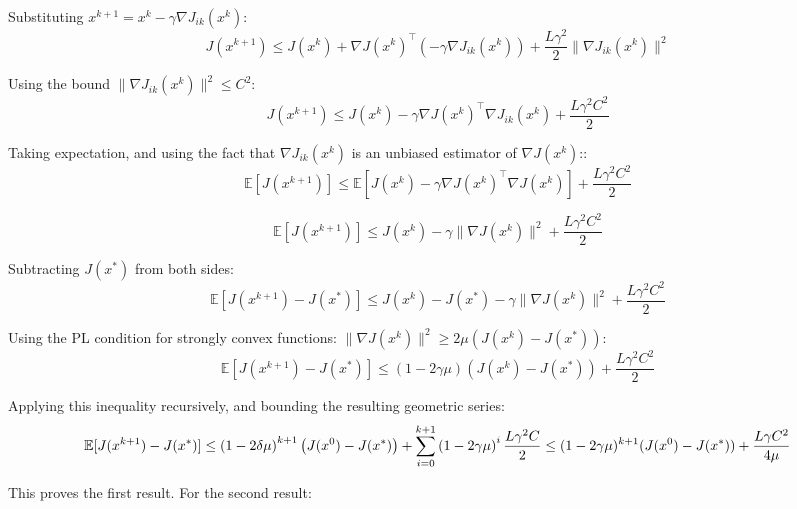   Substituting $x^{k+1} = x^k - \gamma \nabla J_{ik}(x^k)$:
    \begin{equation*}
        J(x^{k+1}) \leq J(x^k) + \nabla J(x^k)^\top(-\gamma \nabla J_{ik}(x^k)) + \frac{L\gamma^2}{2}\|\nabla J_{ik}(x^k)\|^2
    \end{equation*}

Using the bound $\|\nabla J_{ik}(x^k)\|^2 \leq C^2$:
    \begin{equation*}
        J(x^{k+1}) \leq J(x^k) - \gamma \nabla J(x^k)^\top \nabla J_{ik}(x^k) + \frac{L\gamma^2 C^2}{2}
    \end{equation*}

  Taking expectation, and using the fact that $\nabla J_{ik}(x^k)$ is an unbiased estimator of $\nabla J(x^k)$::
    \begin{equation*}
        \mathbb{E}[J(x^{k+1})] \leq \mathbb{E}[J(x^k) - \gamma \nabla J(x^k)^\top \nabla J(x^k)] + \frac{L\gamma^2 C^2}{2}
    \end{equation*}


    \begin{equation*}
        \mathbb{E}[J(x^{k+1})] \leq J(x^k) - \gamma \|\nabla J(x^k)\|^2 + \frac{L\gamma^2 C^2}{2}
    \end{equation*}

   Subtracting $J(x^*)$ from both sides:
    \begin{equation*}
        \mathbb{E}[J(x^{k+1}) - J(x^*)] \leq J(x^k) - J(x^*) - \gamma \|\nabla J(x^k)\|^2 + \frac{L\gamma^2 C^2}{2}
    \end{equation*}

   Using the PL condition for strongly convex functions: $\|\nabla J(x^k)\|^2 \geq 2\mu(J(x^k) - J(x^*))$:
    \begin{equation*}
        \mathbb{E}[J(x^{k+1}) - J(x^*)] \leq (1-2\gamma\mu)(J(x^k) - J(x^*)) + \frac{L\gamma^2 C^2}{2}
    \end{equation*}

    Applying this inequality recursively, and bounding the resulting geometric series:
    \begin{equation*}
        \mathbb{E}[J(x^{k+1}) - J(x^*)] \leq \left(1 - 2 \delta \mu\right)^{k+1} \left(J(x^0) - J(x^*)\right) + \sum_{i=0}^{k+1} \left(1 - 2 \gamma \mu\right)^i \frac{L \gamma^2 C}{2}  \\
\leq (1-2\gamma\mu)^{k+1}(J(x^0) - J(x^*)) + \frac{L\gamma C^2}{4\mu}
    \end{equation*}

This proves the first result. For the second result:\\


